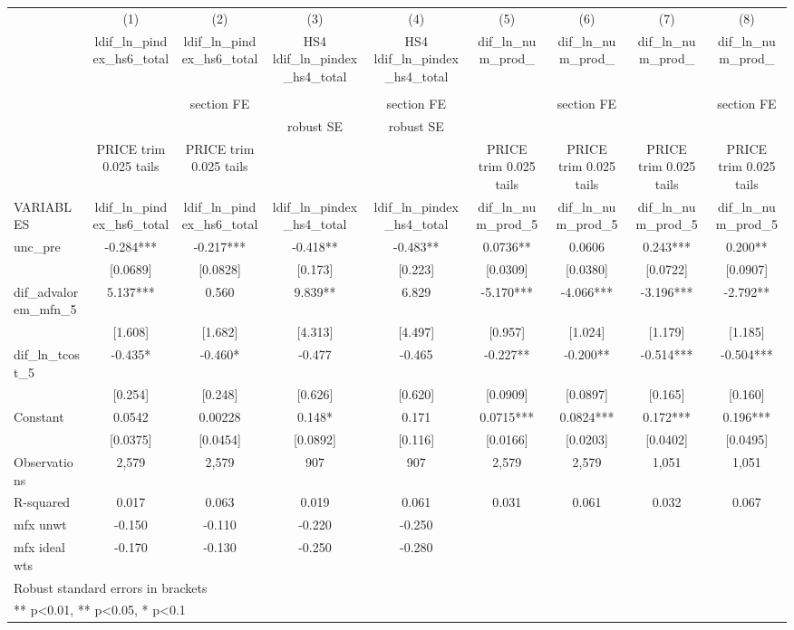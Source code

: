 \begin{adjustbox}{max width=\textwidth}
\begin{tabular}{lcccccccc}
\toprule
 & (1) & (2) & (3) & (4) & (5) & (6) & (7) & (8) \\
 & ldif\_ln\_pindex\_hs6\_total & ldif\_ln\_pindex\_hs6\_total & HS4 ldif\_ln\_pindex\_hs4\_total & HS4 ldif\_ln\_pindex\_hs4\_total & dif\_ln\_num\_prod\_ & dif\_ln\_num\_prod\_ & dif\_ln\_num\_prod\_ & dif\_ln\_num\_prod\_ \\
 &  &  &  &  &  &  &  &  \\
 &  & section FE &  & section FE &  & section FE &  & section FE \\
 &  &  & robust SE & robust SE &  &  &  &  \\
 & PRICE trim 0.025 tails & PRICE trim 0.025 tails &  &  & PRICE trim 0.025 tails & PRICE trim 0.025 tails & PRICE trim 0.025 tails & PRICE trim 0.025 tails \\
VARIABLES & ldif\_ln\_pindex\_hs6\_total & ldif\_ln\_pindex\_hs6\_total & ldif\_ln\_pindex\_hs4\_total & ldif\_ln\_pindex\_hs4\_total & dif\_ln\_num\_prod\_5 & dif\_ln\_num\_prod\_5 & dif\_ln\_num\_prod\_5 & dif\_ln\_num\_prod\_5 \\
\midrule
unc\_pre & -0.284*** & -0.217*** & -0.418** & -0.483** & 0.0736** & 0.0606 & 0.243*** & 0.200** \\
 & [0.0689] & [0.0828] & [0.173] & [0.223] & [0.0309] & [0.0380] & [0.0722] & [0.0907] \\
dif\_advalorem\_mfn\_5 & 5.137*** & 0.560 & 9.839** & 6.829 & -5.170*** & -4.066*** & -3.196*** & -2.792** \\
 & [1.608] & [1.682] & [4.313] & [4.497] & [0.957] & [1.024] & [1.179] & [1.185] \\
dif\_ln\_tcost\_5 & -0.435* & -0.460* & -0.477 & -0.465 & -0.227** & -0.200** & -0.514*** & -0.504*** \\
 & [0.254] & [0.248] & [0.626] & [0.620] & [0.0909] & [0.0897] & [0.165] & [0.160] \\
Constant & 0.0542 & 0.00228 & 0.148* & 0.171 & 0.0715*** & 0.0824*** & 0.172*** & 0.196*** \\
 & [0.0375] & [0.0454] & [0.0892] & [0.116] & [0.0166] & [0.0203] & [0.0402] & [0.0495] \\
\midrule
Observations & 2,579 & 2,579 & 907 & 907 & 2,579 & 2,579 & 1,051 & 1,051 \\
R-squared & 0.017 & 0.063 & 0.019 & 0.061 & 0.031 & 0.061 & 0.032 & 0.067 \\
mfx unwt & -0.150 & -0.110 & -0.220 & -0.250 &  &  &  &  \\
mfx ideal wts & -0.170 & -0.130 & -0.250 & -0.280 &  &  &  &  \\
\bottomrule
\multicolumn{9}{l}{\footnotesize Robust standard errors in brackets} \\
\multicolumn{9}{l}{\footnotesize *** p<0.01, ** p<0.05, * p<0.1} \\
\end{tabular}
\end{adjustbox}
